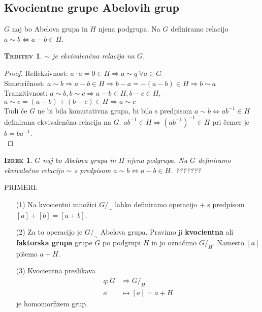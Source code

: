 \documentclass[a4paper,12pt]{article}
\newtheorem*{trditev}{\textsc{Trditev}}
\newtheorem*{izrek}{\textsc{Izrek}}
\begin{document}
\newpage 

\subsection{Kvocientne grupe Abelovih grup}

$G$ naj bo Abelova grupa in $H$ njena podgrupa. Na $G$ definiramo relacijo $a\sim b \Leftrightarrow a-b\in H$. \\

\begin{trditev}
$\sim$ je ekvivalenčna relacija na $G$.\\
\end{trditev}

\begin{proof}
Refleksivnost: $a\cdot a=0\in H \Rightarrow a \sim q ~ \forall a \in G$ \\

Simetričnost: $a\sim b \Rightarrow a-b\in H \Rightarrow b-a=-(a-b)\in H \Rightarrow b\sim a$ \\

Tranzitivnost: $a\sim b, b\sim c \Rightarrow a-b\in H,b-c\in H$, $a\sim c=(a-b)+(b-c)\in H \Rightarrow a\sim c$ \\

Tudi če $G$ ne bi bila komutativna grupa, bi bila s predpisom $a\sim b \Leftrightarrow ab^{-1} \in H$ definirana ekvivalenčna relacija na $G$. $ab^{-1}\in H \Rightarrow (ab^{-1})^{-1}\in H$ pri čemer je $b=ba^{-1}$.\\
\end{proof}

\begin{izrek}
$G$ naj bo Abelova grupa in $H$ njena podgrupa. Na $G$ definiramo ekvivalečno relacijo $\sim$ s predpisom $a\sim b\Leftrightarrow a-b\in H$. ???????\\
\end{izrek}

PRIMERI:
\begin{itemize}
\item[(1)] Na kvocientni množici $G/_\sim$ lahko definiramo operacijo $+$ s predpisom $[a]+[b]=[a+b]$. 
\item[(2)] Za to operacijo je $G/_\sim$ Abelova grupa. Pravimo ji \textbf{kvocientna} ali \textbf{faktorska grupa} grupe $G$ po podgrupi $H$ in jo označimo $G/_H$. Namesto $[a]$ pišemo $a+H$.
\item[(3)] Kvocientna preslikava \begin{align*} q: G & \Rightarrow G/_H \\ a & \mapsto [a]=a+H \end{align*} je homomorfizem grup. \\
\end{itemize}
\end{document}
